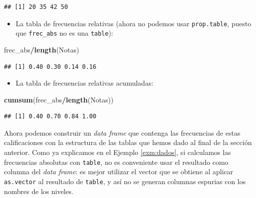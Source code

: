 \documentclass[]{book}
\newenvironment{Shaded}{\begin{snugshade}}{\end{snugshade}}
\newcommand{\KeywordTok}[1]{\textcolor[rgb]{0.13,0.29,0.53}{\textbf{#1}}}
\newcommand{\NormalTok}[1]{#1}
\newcommand{\OperatorTok}[1]{\textcolor[rgb]{0.81,0.36,0.00}{\textbf{#1}}}
\providecommand{\tightlist}{%
  \setlength{\itemsep}{0pt}\setlength{\parskip}{0pt}}
\theoremstyle{definition}
\theoremstyle{definition}
\theoremstyle{definition}
\theoremstyle{remark}
\begin{document}
\begin{verbatim}
## [1] 20 35 42 50
\end{verbatim}

\begin{itemize}
\tightlist
\item
  La tabla de frecuencias relativas (ahora no podemos usar \texttt{prop.table}, puesto que \texttt{frec\_abs} no es una \texttt{table}):
\end{itemize}

\begin{Shaded}
\begin{Highlighting}[]
\NormalTok{frec_abs}\OperatorTok{/}\KeywordTok{length}\NormalTok{(Notas)  }
\end{Highlighting}
\end{Shaded}

\begin{verbatim}
## [1] 0.40 0.30 0.14 0.16
\end{verbatim}

\begin{itemize}
\tightlist
\item
  La tabla de frecuencias relativas acumuladas:
\end{itemize}

\begin{Shaded}
\begin{Highlighting}[]
\KeywordTok{cumsum}\NormalTok{(frec_abs}\OperatorTok{/}\KeywordTok{length}\NormalTok{(Notas))  }
\end{Highlighting}
\end{Shaded}

\begin{verbatim}
## [1] 0.40 0.70 0.84 1.00
\end{verbatim}

Ahora podemos construir un \emph{data frame} que contenga las frecuencias de estas calificaciones con la estructura de las tablas que hemos dado al final de la sección anterior. Como ya explicamos en el Ejemplo \ref{exm:dados}, si calculamos las frecuencias absolutas con \texttt{table}, no es conveniente usar el resultado como columna del \emph{data frame}: es mejor utilizar el vector que se obtiene al aplicar \texttt{as.vector} al resultado de \texttt{table}, y así no se generan columnas espurias con los nombres de los niveles.
\end{document}
